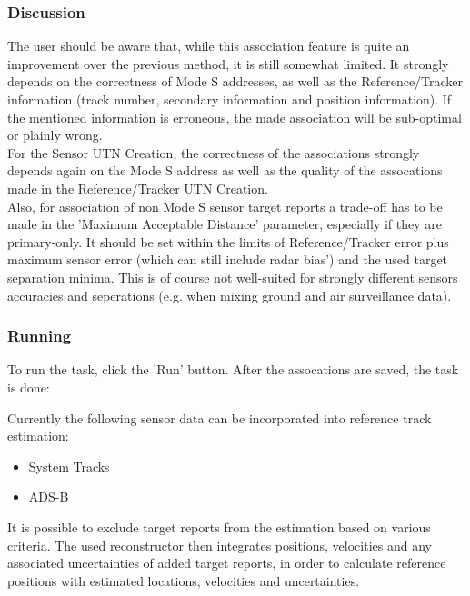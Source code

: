 \subsubsection{Discussion}

The user should be aware that, while this association feature is quite an improvement over the previous method, it is still somewhat limited. It strongly depends on the correctness of Mode S addresses, as well as the Reference/Tracker information (track number, secondary information and position information). If the mentioned information is erroneous, the made association will be sub-optimal or plainly wrong. \\

For the Sensor UTN Creation, the correctness of the associations strongly depends again on the Mode S address as well as the quality of the assocations made in the Reference/Tracker UTN Creation. \\

Also, for association of non Mode S sensor target reports a trade-off has to be made in the 'Maximum Acceptable Distance' parameter, especially if they are primary-only. It should be set within the limits of Reference/Tracker error plus maximum sensor error (which can still include radar bias') and the used target separation minima. This is of course not well-suited for strongly different sensors accuracies and seperations (e.g. when mixing ground and air surveillance data). \\

\subsubsection{Running}

To run the task, click the 'Run' button. After the assocations are saved, the task is done:


Currently the following sensor data can be incorporated into reference track estimation:

\begin{itemize}
    \item System Tracks
    \item ADS-B \\
\end{itemize}

It is possible to exclude target reports from the estimation based on various criteria. 
The used reconstructor then integrates positions, velocities and any associated uncertainties of 
added target reports, in order to calculate reference positions with estimated locations, velocities and uncertainties. \\

